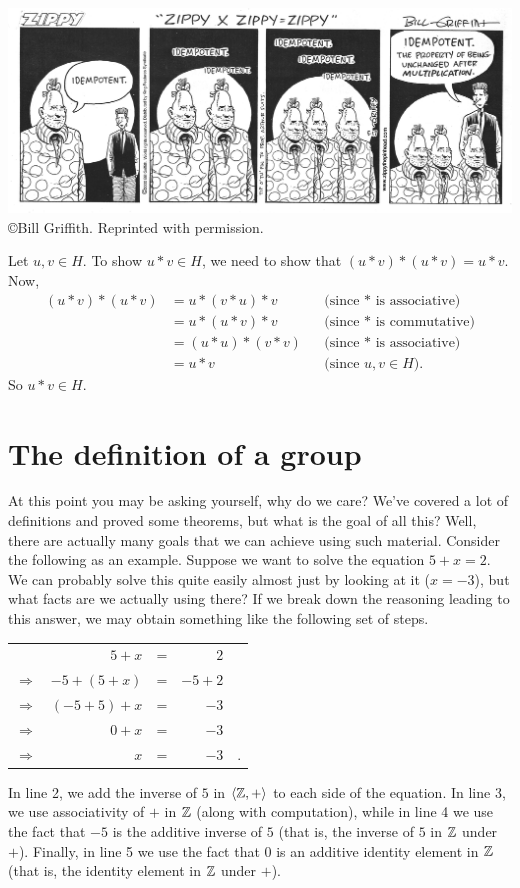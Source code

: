 \bigskip
\begin{center}
\includegraphics[width=\textwidth]{zippy.png}
{\small \copyright Bill Griffith. Reprinted with permission.}
             \end{center}

 \begin{solution}[print=false]
 Let $u,v\in H$.  To show $u*v\in H$, we need to show that $(u*v)*(u*v)=u*v$. Now,
 \begin{align*}
(u*v)*(u*v)&=u*(v*u)*v &&\text{(since $*$ is associative)}\\
&=u*(u*v)*v &&\text{(since $*$ is commutative)}\\
&=(u*u)*(v*v) &&\text{(since $*$ is associative)}\\
&=u*v &&\text{(since $u,v\in H$)}.
\end{align*} So $u*v\in H$.
 \end{solution}



\section{The definition of a group}

At this point you may be asking yourself, why do we care?  We've covered a lot of definitions and proved some theorems, but what is the goal of all this? Well, there are actually many goals that we can achieve using such material.  Consider the following as an example.  Suppose we want to solve the equation $5+x=2$.  We can probably solve this quite easily almost just by looking at it ($x=-3$), but what facts are we actually using there?  If we break down the reasoning leading to this answer, we may obtain something like the following set of steps.

\begin{center}
\begin{tabular}{rrlrl}&$5+x$ &=& $2$& \\
$\Rightarrow$ & $-5+(5+x)$ & = &$-5+2$& \\
$\Rightarrow$ & $(-5+5)+x$ & = &$-3$& \\
$\Rightarrow$ & $0+x$ &= &$-3$& \\
$\Rightarrow$ & $x$&=&$-3$&.
\end{tabular}
\end{center}
In line 2, we add the inverse of $5$ in $\langle\mathbb{Z}, +\rangle$ to each side of
the equation.  In line 3, we use associativity of $+$ in $\mathbb{Z}$ (along
with computation), while in line 4 we use the fact that $-5$ is the
additive inverse of $5$ (that is, the inverse of $5$ in $\mathbb{Z}$ under
$+$).  Finally, in line 5 we use the fact that 0 is an additive
identity element in $\mathbb{Z}$ (that is, the identity element in $\mathbb{Z}$
under $+$).


